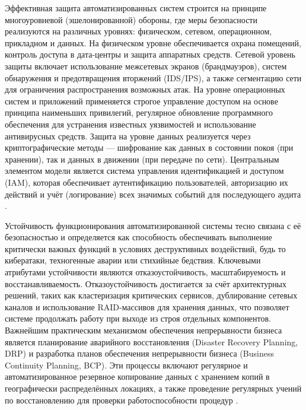 \documentclass{SibFU-docs}
\begin{document}

Эффективная защита автоматизированных систем строится на принципе многоуровневой (эшелонированной) обороны, где меры безопасности реализуются на различных уровнях: физическом, сетевом, операционном, прикладном и данных. На физическом уровне обеспечивается охрана помещений, контроль доступа в дата-центры и защита аппаратных средств. Сетевой уровень защиты включает использование межсетевых экранов (брандмауэров), систем обнаружения и предотвращения вторжений (IDS/IPS), а также сегментацию сети для ограничения распространения возможных атак. На уровне операционных систем и приложений применяется строгое управление доступом на основе принципа наименьших привилегий, регулярное обновление программного обеспечения для устранения известных уязвимостей и использование антивирусных средств. Защита на уровне данных реализуется через криптографические методы — шифрование как данных в состоянии покоя (при хранении), так и данных в движении (при передаче по сети). Центральным элементом модели является система управления идентификацией и доступом (IAM), которая обеспечивает аутентификацию пользователей, авторизацию их действий и учёт (логирование) всех значимых событий для последующего аудита \cite{fstec}.


Устойчивость функционирования автоматизированной системы тесно связана с её безопасностью и определяется как способность обеспечивать выполнение критически важных функций в условиях деструктивных воздействий, будь то кибератаки, техногенные аварии или стихийные бедствия. Ключевыми атрибутами устойчивости являются отказоустойчивость, масштабируемость и восстанавливаемость. Отказоустойчивость достигается за счёт архитектурных решений, таких как кластеризация критических сервисов, дублирование сетевых каналов и использование RAID-массивов для хранения данных, что позволяет системе продолжать работу при выходе из строя отдельных компонентов. Важнейшим практическим механизмом обеспечения непрерывности бизнеса является планирование аварийного восстановления (Disaster Recovery Planning, DRP) и разработка планов обеспечения непрерывности бизнеса (Business Continuity Planning, BCP). Эти процессы включают регулярное и автоматизированное резервное копирование данных с хранением копий в географически распределённых локациях, а также проведение регулярных учений по восстановлению для проверки работоспособности процедур \cite{nist}.
\end{document}
